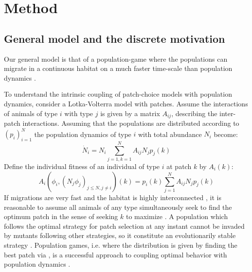 \section{Method}


\subsection{General model and the discrete motivation}
\label{sec:gen_model}
Our general model is that of a population-game \citep{kvrivan2009evolutionary} where the populations can migrate in a continuous habitat on a much faster time-scale than population dynamics \citep{cressman2006migration, abrams2007role}. %

To understand the intrinsic coupling of patch-choice models with population dynamics,
consider a Lotka-Volterra model with patches. Assume the interactions of animals of type $i$ with type $j$ is given by a matrix $A_{ij}$, describing the inter-patch interactions. Assuming that the populations are distributed according to $(p_i)_{i=1}^N$ the population dynamics of type $i$ with total abundance $N_i$ become:
\begin{equation}
  \dot{N}_i = N_i\sum_{j=1,k=1}^N {A_{ij}N_j p_j}(k) %
  \label{eq:pop_dyn_lv}
\end{equation}
Define the individual fitness of an individual of type $i$ at patch $k$ by $A_i(k)$:
\begin{equation}
  A_i(\phi_i, (N_j \phi_j)_{j \leq N, j \neq i})(k) = p_i(k) \sum_{j=1}^N {A_{ij}N_j p_j}(k) %
  \label{eq:utility_pm}
\end{equation}
If migrations are very fast and the habitat is highly interconnected \citep{abrams2007role, cressman2006migration}, it is reasonable to assume all animals of any type simultaneously seek to find the optimum patch in the sense of seeking $k$ to maximize . A population which follows the optimal strategy for patch selection at any instant cannot be invaded by mutants following other strategies, so it constitute an evolutionarily stable strategy \citep{kvrivan2009evolutionary}. Population games, i.e.  where the distribution is given by finding the best patch via , is a successful approach to coupling optimal behavior with population dynamics \citep{kvrivan2008ideal,morris2020time,mougi2019adaptive}.

